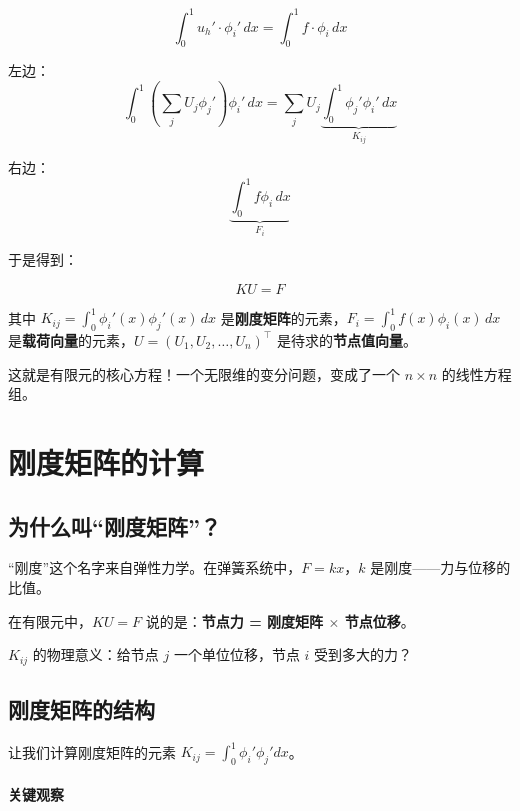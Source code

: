 \[
\int_0^1 u_h' \cdot \phi_i' \, dx = \int_0^1 f \cdot \phi_i \, dx
\]

左边：
\[
\int_0^1 \left(\sum_j U_j \phi_j'\right) \phi_i' \, dx = \sum_j U_j \underbrace{\int_0^1 \phi_j' \phi_i' \, dx}_{K_{ij}}
\]

右边：
\[
\underbrace{\int_0^1 f \phi_i \, dx}_{F_i}
\]

于是得到：

\begin{keyformula}[title=有限元线性方程组]
\begin{equation}
\boxed{KU = F}
\end{equation}

其中 $K_{ij} = \int_0^1 \phi_i'(x) \phi_j'(x) \, dx$ 是\textbf{刚度矩阵}的元素，$F_i = \int_0^1 f(x) \phi_i(x) \, dx$ 是\textbf{载荷向量}的元素，$U = (U_1, U_2, \ldots, U_n)^\top$ 是待求的\textbf{节点值向量}。
\end{keyformula}

这就是有限元的核心方程！一个无限维的变分问题，变成了一个 $n \times n$ 的线性方程组。

\section{刚度矩阵的计算}

\subsection{为什么叫“刚度矩阵”？}

“刚度”这个名字来自弹性力学。在弹簧系统中，$F = kx$，$k$ 是刚度——力与位移的比值。

在有限元中，$KU = F$ 说的是：\textbf{节点力 = 刚度矩阵 $\times$ 节点位移}。

$K_{ij}$ 的物理意义：给节点 $j$ 一个单位位移，节点 $i$ 受到多大的力？

\subsection{刚度矩阵的结构}

让我们计算刚度矩阵的元素 $K_{ij} = \int_0^1 \phi_i' \phi_j' dx$。

\paragraph{关键观察}

